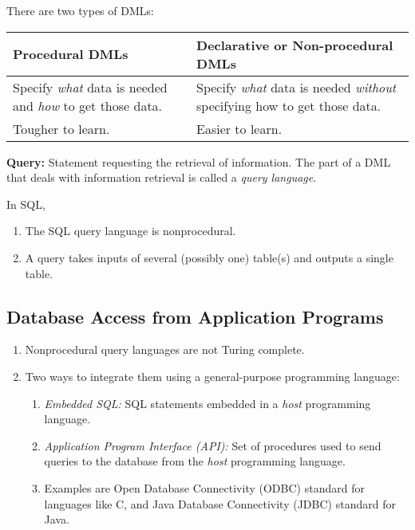 \documentclass[journal,12pt,twocolumn]{IEEEtran}
\begin{document}
There are two types of DMLs:

\begin{table}[!ht]
    \centering
    \begin{tabularx}{\columnwidth}{|X|X|}
    \hline
    \textbf{Procedural DMLs} & \textbf{Declarative or Non-procedural DMLs} \\
    \hline
    Specify \textit{what} data is needed and \textit{how} to get 
    those data. & Specify \textit{what} data is needed 
    \textit{without} specifying how to get those data. \\
    \hline
    Tougher to learn. & Easier to learn. \\
    \hline
    \end{tabularx}
    \label{tab:diff}
\end{table}

\textbf{Query:} Statement requesting the retrieval of information. The part of 
a DML that deals with information retrieval is called a \textit{query language}.

In SQL,
\begin{enumerate}
    \item The SQL query language is nonprocedural.
    \item A query takes inputs of several (possibly one) table(s) and outputs a
    single table.
\end{enumerate}

\subsection{Database Access from Application Programs}
\begin{enumerate}
    \item Nonprocedural query languages are not Turing complete.
    \item Two ways to integrate them using a general-purpose programming language:
    \begin{enumerate}
        \item \textit{Embedded SQL:} SQL statements embedded in a \textit{host} 
        programming language.
        \item \textit{Application Program Interface (API):} Set of procedures 
        used to send queries to the database from the \textit{host} programming
        language.
        \item Examples are Open Database Connectivity (ODBC) standard for 
        languages like C, and Java Database Connectivity (JDBC) standard for 
        Java.
    \end{enumerate}
\end{enumerate}
\end{document}

